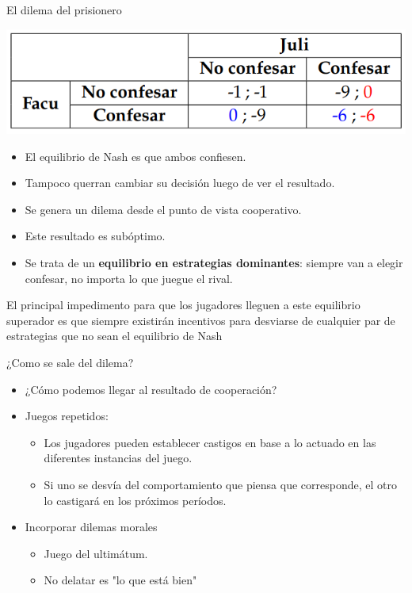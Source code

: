 \documentclass{beamer}
\begin{document}
\begin{frame}{El dilema del prisionero}
    \begin{center}
        \includegraphics[scale=0.6]{../Figures/T20.9.png}
    \end{center}
    \begin{itemize}
        \item El equilibrio de Nash es que ambos confiesen.
        \item Tampoco querran cambiar su decisión luego de ver el resultado.
        \item Se genera un dilema desde el punto de vista cooperativo.
        \item Este resultado es subóptimo.
        \item Se trata de un \textbf{equilibrio en estrategias dominantes}: siempre van a elegir confesar, no importa lo que juegue el rival.
    \end{itemize}
    \begin{boxA}
        \centering
        El principal impedimento para que los jugadores lleguen a este equilibrio superador es que siempre existirán incentivos para desviarse de cualquier par de estrategias que no sean el equilibrio de Nash
    \end{boxA}
\end{frame}

\begin{frame}{¿Como se sale del dilema?}
    \begin{itemize}
        \item ¿Cómo podemos llegar al resultado de cooperación?
        \item Juegos repetidos:
        \begin{itemize}
            \item Los jugadores pueden establecer castigos en base a lo actuado en las diferentes instancias del juego.
            \item  Si uno se desvía del comportamiento que piensa que corresponde, el otro lo castigará en los próximos períodos.
        \end{itemize}
        \item Incorporar dilemas morales
        \begin{itemize}
            \item Juego del ultimátum.
            \item No delatar es "lo que está bien"
        \end{itemize}
    \end{itemize}
\end{frame}
\end{document}
